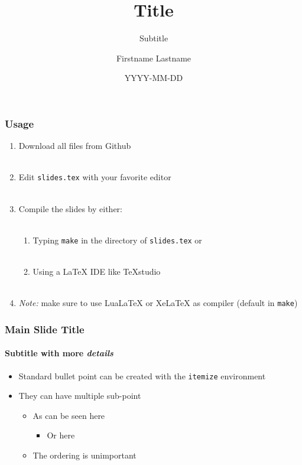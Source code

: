 \documentclass[aspectratio=1610]{beamer}
\title{Title}
\subtitle{Subtitle}
\author{Firstname Lastname}
\date{YYYY-MM-DD}
\institute{Center}
\begin{document}
\maketitle

\begin{frame}
    \frametitle{Usage}
    
    \begin{enumerate}
        \item Download all files from Github\\~
        \item Edit \texttt{slides.tex} with your favorite editor\\~
        \item Compile the slides by either:\\~
        \begin{enumerate}
            \item Typing \texttt{make} in the directory of \texttt{slides.tex} or\\~
            \item Using a LaTeX IDE like TeXstudio\\~
        \end{enumerate}
        \item \emph{Note:} make sure to use LuaLaTeX or XeLaTeX as compiler (default in \texttt{make})
    \end{enumerate}
\end{frame}

\begin{frame}
    \frametitle{Main Slide Title}
    \framesubtitle{\textbf{Subtitle} with more \emph{details}}
    
    \begin{itemize}
        \item Standard bullet point can be created with the \texttt{itemize} environment
        \item They can have multiple sub-point
        \begin{itemize}
            \item As can be seen here
            \begin{itemize}
                \item Or here
            \end{itemize}
            \item The ordering is unimportant
        \end{itemize}
    \end{itemize}
\end{frame}
\end{document}
